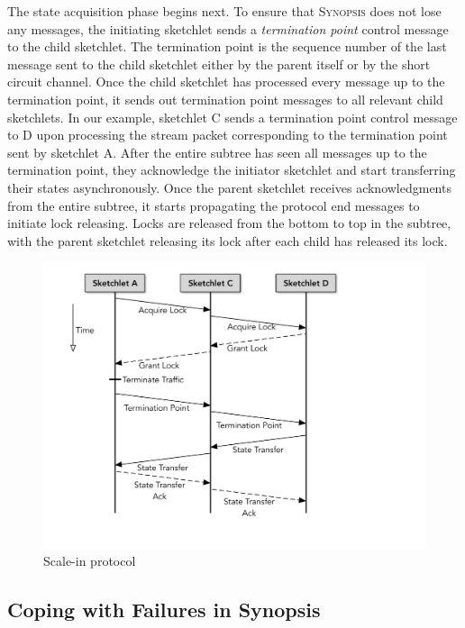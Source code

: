 The state acquisition phase begins next.
To ensure that \textsc{Synopsis} does not lose any messages, the initiating sketchlet sends a \emph{termination point} control message to the child sketchlet.
The termination point is the sequence number of the last message sent to the child sketchlet either by the parent itself or by the short circuit channel.
Once the child sketchlet has processed every message up to the termination point, it sends out termination point messages to all relevant child sketchlets. In our example, sketchlet C sends a termination point control message to D upon processing the stream packet corresponding to the termination point sent by sketchlet A.
After the entire subtree has seen all messages up to the termination point, they acknowledge the initiator sketchlet and start transferring their states asynchronously.
Once the parent sketchlet receives acknowledgments from the entire subtree, it starts propagating the protocol end messages to initiate lock releasing.
Locks are released from the bottom to top in the subtree, with the parent sketchlet releasing its lock after each child has released its lock.
%
\begin{figure}[h!]
    \centering
    \includegraphics[scale=0.4, valign=t]{figures/scale-in.pdf} 
    \caption{Scale-in protocol}
    \label{fig:scale-in-protocol}
\end{figure}
\label{subsec:scaling-in}


\subsection{Coping with Failures in Synopsis}


